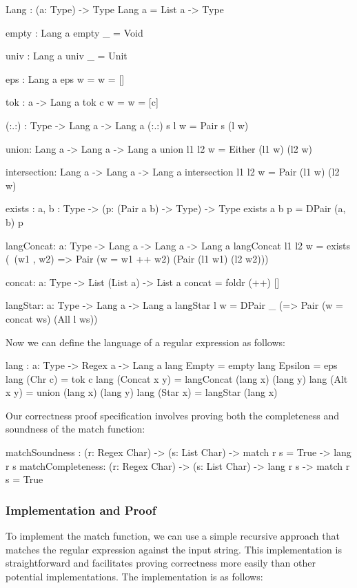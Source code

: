 \documentclass[]{rptuseminar}
\begin{document}
\begin{idris}
Lang : (a: Type) -> Type
Lang a = List a -> Type

empty : Lang a
empty _ = Void

univ : Lang a
univ _ = Unit 

eps : Lang a
eps w = w = []

tok : a -> Lang a
tok c w = w = [c]

(:.:) : Type -> Lang a -> Lang a  
(:.:) s l w = Pair s (l w)

union: Lang a -> Lang a -> Lang a
union l1 l2 w = Either (l1 w) (l2 w)

intersection: Lang a -> Lang a -> Lang a
intersection l1 l2 w = Pair (l1 w) (l2 w)

exists : {a, b : Type} -> (p: (Pair a b) -> Type) -> Type 
exists {a} {b} p = DPair (a, b) p 

langConcat: {a: Type} -> Lang a -> Lang a -> Lang a  
langConcat l1 l2 w = 
  exists (\ (w1 , w2) => Pair (w = w1 ++ w2) (Pair (l1 w1) (l2 w2)))

concat: {a: Type} -> List (List a) -> List a
concat = foldr (++) []

langStar: {a: Type} -> Lang a -> Lang a
langStar l w  = DPair _ (\ws => Pair (w = concat ws) (All l ws))
\end{idris}

Now we can define the language of a regular expression as follows:

\begin{idris}
lang : {a: Type} -> Regex a -> Lang a
lang Empty = empty
lang Epsilon = eps
lang (Chr c) = tok c
lang (Concat x y) = langConcat (lang x) (lang y)
lang (Alt x y) = union (lang x) (lang y)
lang (Star x) = langStar (lang x)
\end{idris}

Our correctness proof specification involves proving both the completeness and soundness of the match function:

\begin{idris}
matchSoundness : (r: Regex Char) -> (s: List Char) -> match r s = True -> lang r s
matchCompleteness: (r: Regex Char) -> (s: List Char) -> lang r s -> match r s = True
\end{idris}

\subsubsection{Implementation and Proof}
To implement the match function, we can use a simple recursive approach that matches the regular expression against the input string. This implementation is straightforward and facilitates proving correctness more easily than other potential implementations. The implementation is as follows:
\end{document}
